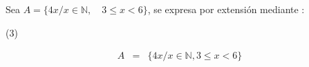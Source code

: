 \item{Sea $A = \{ 4x/x \in \mathbb{N},\quad 3 \le x < 6\}$, se expresa por extensión mediante : 
\begin{tasks}(3)
\end{tasks}
	\begin{eqnarray*}
	A &=& \{ 4x/x \in \mathbb{N}, 3 \le x < 6\}
	\end{eqnarray*}
}
